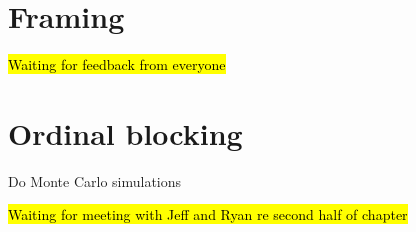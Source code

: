 \section*{Framing}
	\begin{coi}
		\item \hl{Waiting for feedback from everyone}
	\end{coi} 

\section*{Ordinal blocking}
	\begin{coi}
		\item Do Monte Carlo simulations
			\begin{coi}
				\item \hl{Waiting for meeting with Jeff and Ryan re second half of chapter}
			\end{coi}
	\end{coi}
	

	




